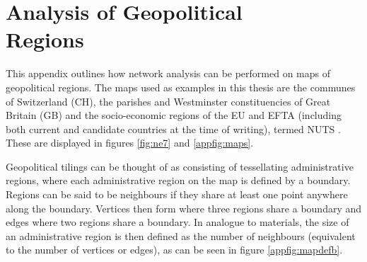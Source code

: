 \chapter[Analysis of Geopoltical Regions]{Analysis of Geopolitical \\ Regions}
\label{app:maps}

This appendix outlines how network analysis can be performed on maps of geopolitical regions. 
The maps used as examples in this thesis are the communes of Switzerland (CH), the parishes and Westminster constituencies of Great Britain (GB) and the socio\--economic regions of the EU and EFTA (including both current and candidate countries at the time of writing), termed NUTS \cite{osmap,chmap,eumap}.
These are displayed in figures \ref{fig:ne7} and \ref{appfig:maps}.

Geopolitical tilings can be thought of as consisting of tessellating administrative regions, where each administrative region on the map is defined by a boundary.
Regions can be said to be neighbours if they share at least one point anywhere along the boundary.
Vertices then form where three regions share a boundary and edges where two regions share a boundary.
In analogue to materials, the size of an administrative region is then defined as the number of neighbours (equivalent to the number of vertices or edges), as can be seen in figure \ref{appfig:mapdefb}.

